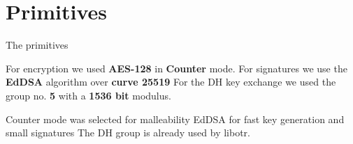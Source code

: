 \section{Primitives}

\begin{frame}
\Huge{\centerline{The primitives}}
\end{frame}

\begin{frame}
  For encryption we used {\bf AES-128} in {\bf Counter} mode.
  \vfill
  For signatures we use the {\bf EdDSA} algorithm over {\bf curve 25519}
  \vfill
  For the DH key exchange we used the group no. {\bf 5} with a {\bf 1536 bit} modulus.
\end{frame}

\begin{frame}
  Counter mode was selected for malleability
  \vfill
  EdDSA for fast key generation and small signatures
  \vfill
  The DH group is already used by libotr.
\end{frame}
